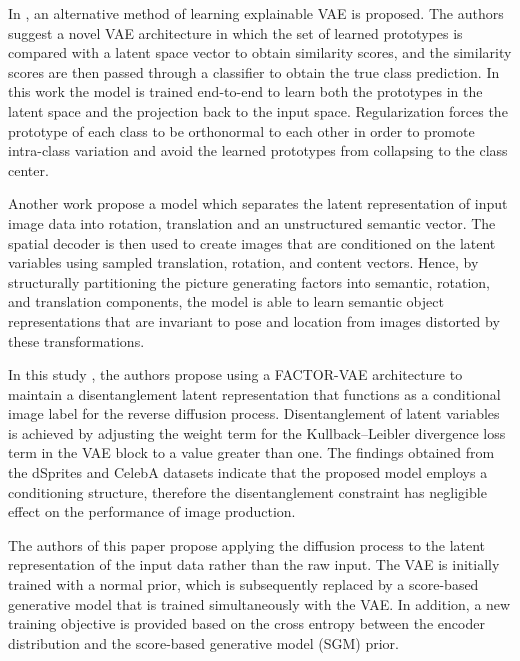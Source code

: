 In \cite{PROTOVAE2022}, an alternative method of learning explainable VAE is proposed. The authors suggest a novel VAE architecture in which the set of learned prototypes is compared with a latent space vector to obtain similarity scores, and the similarity scores are then passed through a classifier to obtain the true class prediction. In this work the model is trained end-to-end to learn both the prototypes in the latent space and the projection back to the input space. Regularization forces the prototype of each class to be orthonormal to each other in order to promote intra-class variation and avoid the learned prototypes from collapsing to the class center.

Another work \cite{ROTVAE2022} propose a model which separates the latent representation of input image data into rotation, translation and an unstructured semantic vector. The spatial decoder is then used to create images that are conditioned on the latent variables using sampled translation, rotation, and content vectors. Hence, by structurally partitioning the picture generating factors into semantic, rotation, and translation components, the model is able to learn semantic object representations that are invariant to pose and location from images distorted by these transformations.

In this study \cite{kim2022unsupervised}, the authors propose using a FACTOR-VAE architecture to maintain a disentanglement latent representation that functions as a conditional image label for the reverse diffusion process. Disentanglement of latent variables is achieved by adjusting the weight term for the Kullback–Leibler divergence loss term in the VAE block to a value greater than one. The findings obtained from the dSprites and CelebA datasets indicate that the proposed model employs a conditioning structure, therefore the disentanglement constraint has negligible effect on the performance of image production.

The authors of this paper \cite{vahdat2021scorebased} propose applying the diffusion process to the latent representation of the input data rather than the raw input. The VAE is initially trained with a normal prior, which is subsequently replaced by a score-based generative model that is trained simultaneously with the VAE. In addition, a new training objective is provided based on the cross entropy between the encoder distribution and the score-based generative model (SGM) prior. 

